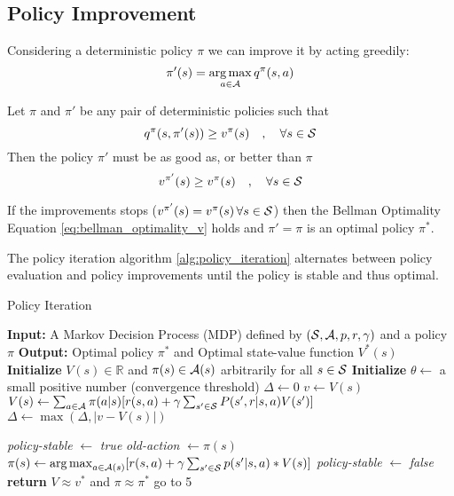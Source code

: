 \subsection{Policy Improvement}
Considering a deterministic policy $\pi$ we can improve it by acting greedily:
\[\pi'(s) = \operatorname*{arg\,max}_{a \in \mathcal{A}}q^\pi(s,a)\]

\begin{theorem}
    \label{th:policy_improvement}
    Let $\pi$ and $\pi'$ be any pair of deterministic policies such that
    \begin{equation*}
    q^\pi(s,\pi'(s)) \ge v^\pi(s) \quad, \quad \forall s \in \mathcal{S}
    \end{equation*}
    Then the policy $\pi'$ must be as good as, or better than $\pi$
    \begin{equation}
    v^{\pi'}(s) \ge v^\pi(s) \quad, \quad \forall s \in \mathcal{S}
    \end{equation}
\end{theorem}

If the improvements stops ($v^{\pi'}(s) = v^\pi(s) \, \forall s \in \mathcal{S}$) then the Bellman Optimality Equation \eqref{eq:bellman_optimality_v}
holds and $\pi' = \pi$ is an optimal policy $\pi^*$.

The policy iteration algorithm \ref{alg:policy_iteration} alternates between policy evaluation and policy improvements until the policy is stable and
thus optimal.

\begin{algorithm}[H]
    \caption{Policy Iteration}
    \label{alg:policy_iteration}
    \begin{algorithmic}[1]
        \STATE \textbf{Input:} A Markov Decision Process (MDP) defined by $(\mathcal{S}, \mathcal{A}, p, r, \gamma)$ and a policy $\pi$
        \STATE \textbf{Output:} Optimal policy $\pi^*$ and Optimal state-value function $V^*(s)$
        \STATE \textbf{Initialize} $V(s) \in \mathbb{R}$ and $\pi(s) \in \mathcal{A}(s)$ arbitrarily for all $s \in \mathcal{S}$
        \STATE \textbf{Initialize} $\theta \gets$ a small positive number (convergence threshold)
        \REPEAT
            \STATE $\Delta \gets 0$
                \STATE $v \gets V(s)$
                \STATE $V(s) \gets \sum_{a \in \mathcal{A}} \pi(a|s) [r(s,a) + \gamma \sum_{s' \in \mathcal{S}} P(s', r | s, a) V(s')]$
                \STATE $\Delta \gets \max(\Delta, |v - V(s)|)$
            \ENDFOR
        \UNTIL{$\Delta < \theta$}
        
        \STATE \textit{policy-stable} $\gets$ \textit{true}
            \STATE \textit{old-action} $\gets \pi(s)$
            \STATE $\pi(s) \gets \operatorname*{arg\,max}_{a \in \mathcal{A}(s)}[r(s,a) + \gamma \sum_{s' \in \mathcal{S}}p(s'|s,a) * V(s)]$
                \STATE \textit{policy-stable} $\gets$ \textit{false}
            \ENDIF
        \ENDFOR
            \STATE \textbf{return} $V \approx v^*$ and $\pi \approx \pi^*$
        \ELSE
            \STATE go to 5
        \ENDIF
    \end{algorithmic}
\end{algorithm}

